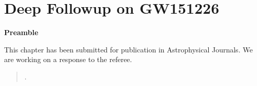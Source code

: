 \chapter[GW151226 Deep-Followup]{Deep Followup on GW151226}
\label{ch.deep}

\textbf{Preamble}

This chapter has been submitted for publication in Astrophysical Journals. 
We are working on a response to the referee. 

\begin{quote}
.
\end{quote}



